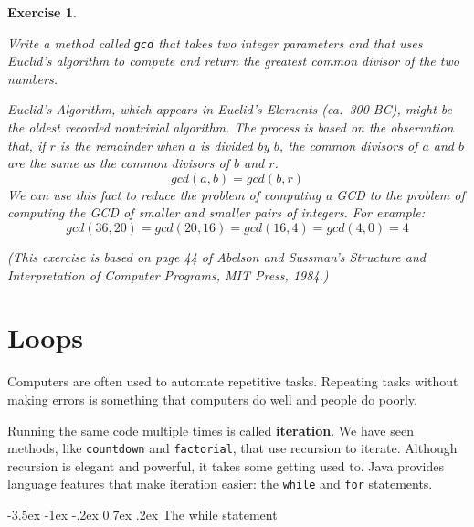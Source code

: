 \documentclass[12pt]{book}
\makeatletter
\theoremstyle{exercise}
\newtheorem{exercise}{Exercise}[chapter]
\newcommand{\java}[1]{\verb"#1"}
\renewcommand{\section}{\@startsection{section}{1}{\z@}%
    {-3.5ex \@plus -1ex \@minus -.2ex}%
    {0.7ex \@plus.2ex}%
    {\normalfont\Large\bfseries}}
\newcommand{\java}[1]{\lstinline{#1}} %
\makeatother
\begin{document}
\begin{exercise}
\label{gcd}

Write a method called \java{gcd} that takes two integer parameters and that uses Euclid's algorithm to compute and return the greatest common divisor of the two numbers.

Euclid's Algorithm, which appears in Euclid's {\em Elements} (ca.~300 BC), might be the oldest recorded nontrivial algorithm.
The process is based on the observation that, if $r$ is the remainder when $a$ is divided by $b$, the common divisors of $a$ and $b$ are the same as the common divisors of $b$ and $r$.
\[ gcd(a, b) = gcd(b, r) \]
%
We can use this fact to reduce the problem of computing a GCD to the problem of computing the GCD of smaller and smaller pairs of integers.
For example:
\[ gcd(36, 20) = gcd(20, 16) = gcd(16, 4) = gcd(4, 0) = 4 \]


(This exercise is based on page 44 of Abelson and Sussman's {\em Structure and Interpretation of Computer Programs}, MIT Press, 1984.)

\end{exercise}


\chapter{Loops}

Computers are often used to automate repetitive tasks.
Repeating tasks without making errors is something that computers do well and people do poorly.


Running the same code multiple times is called {\bf iteration}.
We have seen methods, like \java{countdown} and \java{factorial}, that use recursion to iterate.
Although recursion is elegant and powerful, it takes some getting used to.
Java provides language features that make iteration easier:
the \java{while} and \java{for} statements.


\section{The while statement}

\end{document}
